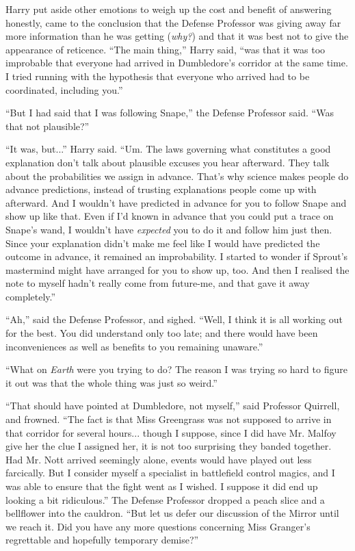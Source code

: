 Harry put aside other emotions to weigh up the cost and benefit of answering honestly, came to the conclusion that the Defense Professor was giving away far more information than he was getting (\emph{why?}) and that it was best not to give the appearance of reticence. ``The main thing,'' Harry said, ``was that it was too improbable that everyone had arrived in Dumbledore's corridor at the same time. I tried running with the hypothesis that everyone who arrived had to be coordinated, including you.''

``But I had said that I was following Snape,'' the Defense Professor said. ``Was that not plausible?''

``It was, but...'' Harry said. ``Um. The laws governing what constitutes a good explanation don't talk about plausible excuses you hear afterward. They talk about the probabilities we assign in advance. That's why science makes people do advance predictions, instead of trusting explanations people come up with afterward. And I wouldn't have predicted in advance for you to follow Snape and show up like that. Even if I'd known in advance that you could put a trace on Snape's wand, I wouldn't have \emph{expected} you to do it and follow him just then. Since your explanation didn't make me feel like I would have predicted the outcome in advance, it remained an improbability. I started to wonder if Sprout's mastermind might have arranged for you to show up, too. And then I realised the note to myself hadn't really come from future-me, and that gave it away completely.''

``Ah,'' said the Defense Professor, and sighed. ``Well, I think it is all working out for the best. You did understand only too late; and there would have been inconveniences as well as benefits to you remaining unaware.''

``What on \emph{Earth} were you trying to do? The reason I was trying so hard to figure it out was that the whole thing was just so weird.''

``That should have pointed at Dumbledore, not myself,'' said Professor Quirrell, and frowned. ``The fact is that Miss Greengrass was not supposed to arrive in that corridor for several hours... though I suppose, since I did have Mr. Malfoy give her the clue I assigned her, it is not too surprising they banded together. Had Mr. Nott arrived seemingly alone, events would have played out less farcically. But I consider myself a specialist in battlefield control magics, and I was able to ensure that the fight went as I wished. I suppose it did end up looking a bit ridiculous.'' The Defense Professor dropped a peach slice and a bellflower into the cauldron. ``But let us defer our discussion of the Mirror until we reach it. Did you have any more questions concerning Miss Granger's regrettable and hopefully temporary demise?''

